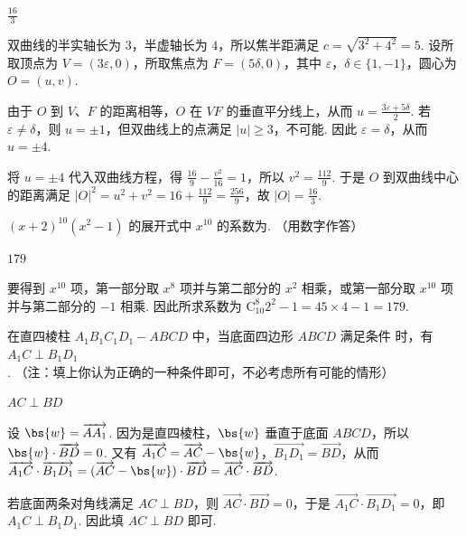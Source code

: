 \documentclass[UTF8,a4paper,oneside,11pt]{ctexbook}
\begin{document}
\begin{answer}
\(\frac{16}{3}\)
\end{answer}

\begin{solution}
双曲线的半实轴长为 \(3\)，半虚轴长为 \(4\)，所以焦半距满足
\(c=\sqrt{3^{2}+4^{2}}=5\). 设所取顶点为 \(V=(3\varepsilon,0)\)，所取焦点为 \(F=(5\delta,0)\)，其中 \(\varepsilon\)，\(\delta\in\{1,-1\}\)，圆心为 \(O=(u,v)\).

由于 \(O\) 到 \(V\)、\(F\) 的距离相等，\(O\) 在 \(VF\) 的垂直平分线上，从而
\(u=\frac{3\varepsilon+5\delta}{2}\). 若 \(\varepsilon\neq\delta\)，则 \(u=\pm1\)，但双曲线上的点满足 \(|u|\geq3\)，不可能. 因此 \(\varepsilon=\delta\)，从而 \(u=\pm4\).

将 \(u=\pm4\) 代入双曲线方程，得
\(\frac{16}{9}-\frac{v^{2}}{16}=1\)，所以 \(v^{2}=\frac{112}{9}\). 于是
\(O\) 到双曲线中心的距离满足
\(\lvert O\rvert^{2}=u^{2}+v^{2}=16+\frac{112}{9}=\frac{256}{9}\)，故 \(\lvert O\rvert=\frac{16}{3}\).
\end{solution}

\begin{problem}
\((x + 2)^{10}(x^{2} - 1)\) 的展开式中 \(x^{10}\) 的系数为\fillinblank{}. （用数字作答）
\end{problem}

\begin{answer}
\(179\)
\end{answer}

\begin{solution}
要得到 \(x^{10}\) 项，第一部分取 \(x^{8}\) 项并与第二部分的 \(x^{2}\) 相乘，或第一部分取 \(x^{10}\) 项并与第二部分的 \(-1\) 相乘. 因此所求系数为
\(\mathrm C_{10}^{8}2^{2}-1=45\times4-1=179\).
\end{solution}

\begin{problem}
在直四棱柱 \(A_{1}B_{1}C_{1}D_{1}-ABCD\) 中，当底面四边形 \(ABCD\) 满足条件\fillinblank{} 时，有 \(A_{1}C \perp B_{1}D_{1}\). （注：填上你认为正确的一种条件即可，不必考虑所有可能的情形）
\end{problem}

\begin{answer}
\(AC\perp BD\)
\end{answer}

\begin{solution}
设 \(\bs{w}=\overrightarrow{AA_{1}}\). 因为是直四棱柱，\(\bs{w}\) 垂直于底面 \(ABCD\)，所以 \(\bs{w}\cdot\overrightarrow{BD}=0\). 又有
\(\overrightarrow{A_{1}C}=\overrightarrow{AC}-\bs{w}\)，\(\overrightarrow{B_{1}D_{1}}=\overrightarrow{BD}\)，从而
\(\overrightarrow{A_{1}C}\cdot\overrightarrow{B_{1}D_{1}}=(\overrightarrow{AC}-\bs{w})\cdot\overrightarrow{BD}=\overrightarrow{AC}\cdot\overrightarrow{BD}\).

若底面两条对角线满足 \(AC\perp BD\)，则 \(\overrightarrow{AC}\cdot\overrightarrow{BD}=0\)，于是
\(\overrightarrow{A_{1}C}\cdot\overrightarrow{B_{1}D_{1}}=0\)，即 \(A_{1}C\perp B_{1}D_{1}\). 因此填 \(AC\perp BD\) 即可.
\end{solution}
\end{document}
